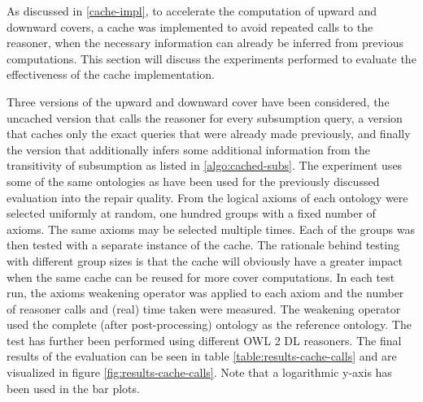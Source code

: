 
As discussed in \cref{cache-impl}, to accelerate the computation of upward and downward covers, a cache was implemented to avoid repeated calls to the reasoner, when the necessary information can already be inferred from previous computations. This section will discuss the experiments performed to evaluate the effectiveness of the cache implementation.

Three versions of the upward and downward cover have been considered, the uncached version that calls the reasoner for every subsumption query, a version that caches only the exact queries that were already made previously, and finally the version that additionally infers some additional information from the transitivity of subsumption as listed in \cref{algo:cached-subs}. The experiment uses some of the same ontologies as have been used for the previously discussed evaluation into the repair quality. From the logical axioms of each ontology were selected uniformly at random, one hundred groups with a fixed number of axioms. The same axioms may be selected multiple times. Each of the groups was then tested with a separate instance of the cache. The rationale behind testing with different group sizes is that the cache will obviously have a greater impact when the same cache can be reused for more cover computations. In each test run, the axioms weakening operator was applied to each axiom and the number of reasoner calls and (real) time taken were measured. The weakening operator used the complete (after post-processing) ontology as the reference ontology. The test has further been performed using different OWL 2 DL reasoners. The final results of the evaluation can be seen in table \cref{table:results-cache-calls} and are visualized in figure \cref{fig:results-cache-calls}. Note that a logarithmic y-axis has been used in the bar plots.

